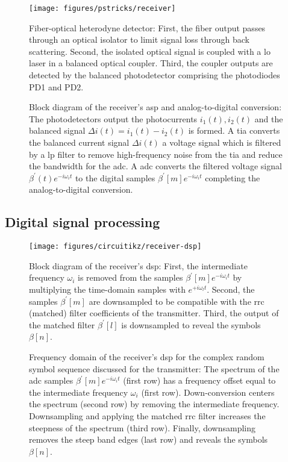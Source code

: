 \begin{figure}[htb]
	\centering
	\texttt{[image: figures/pstricks/receiver]}
	\caption{Fiber-optical heterodyne detector: First, the fiber output passes through an optical isolator to limit signal loss through back scattering. Second, the isolated optical signal is coupled with a \gls{lo} laser in a balanced optical coupler. Third, the coupler outputs are detected by  the balanced photodetector comprising the photodiodes PD1 and PD2.}
\end{figure}

\begin{figure}[htb]
	\centering
	
	\caption{Block diagram of the receiver's \gls{asp} and analog-to-digital conversion: The photodetectors output the photocurrents $i_1(t),i_2(t)$ and the balanced signal $\Delta i(t)=i_1(t)-i_2(t)$ is formed. A \gls{tia} converts the balanced current signal $\Delta i(t)$ a voltage signal which is filtered by a \gls{lp} filter to remove high-frequency noise from the \gls{tia} and reduce the bandwidth for the \gls{adc}. A \gls{adc} converts the filtered voltage signal $\beta^\prime(t)e^{-i\omega_it}$ to the digital samples $\beta^\prime[m]e^{-i\omega_it}$ completing the analog-to-digital conversion.}
\end{figure}

\FloatBarrier
\subsection{Digital signal processing}


\begin{figure}[htb]
	\centering
	\texttt{[image: figures/circuitikz/receiver-dsp]}
	\caption{Block diagram of the receiver's \gls{dsp}: First, the intermediate frequency $\omega_i$ is removed from the samples $\beta^\prime[m]e^{-i\omega_it}$ by multiplying the time-domain samples with $e^{+i\omega_lt}$. Second, the samples $\beta^\prime[m]$ are downsampled to be compatible with the \gls{rrc} (matched) filter coefficients of the transmitter. Third, the output of the matched filter $\beta^\prime[l]$ is downsampled to reveal the symbols $\beta[n]$.}
\end{figure}

\begin{figure}[htb]
	\centering
	
	\caption{Frequency domain of the receiver's \gls{dsp} for the complex random symbol sequence discussed for the transmitter: The spectrum of the \gls{adc} samples $\beta^\prime[m]e^{-i\omega_it}$ (first row) has a frequency offset equal to the intermediate frequency $\omega_i$ (first row). Down-conversion centers the spectrum (second row) by removing the intermediate frequency. Downsampling and applying the matched \gls{rrc} filter increases the steepness of the spectrum (third row). Finally, downsampling removes the steep band edges (last row) and reveals the symbols $\beta[n]$.}
\end{figure}

